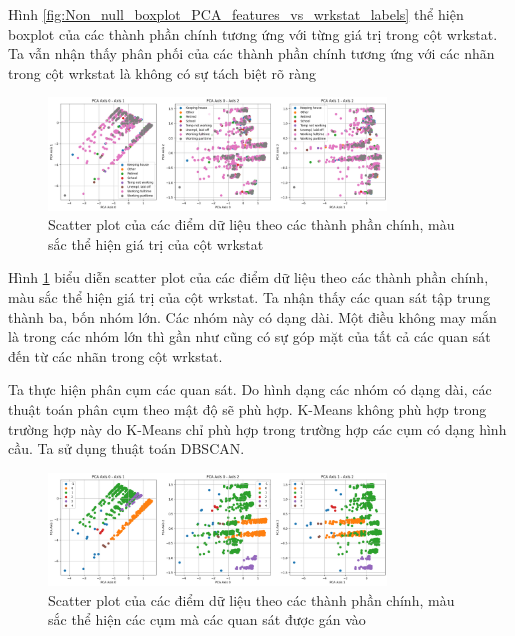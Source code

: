Hình \ref{fig:Non_null_boxplot_PCA_features_vs_wrkstat_labels} thể hiện boxplot của các thành phần chính tương ứng với từng giá trị trong cột wrkstat.
Ta vẫn nhận thấy phân phối của các thành phần chính tương ứng với các nhãn trong cột wrkstat là không có sự tách biệt rõ ràng

\begin{figure}[H]
    \centering
    \includegraphics[width=0.8\textwidth]{figures/Thanh/Data_Analysis/Non_null_scatterplot_couples_of_PCA_features_vs_wrkstat_labels.png}
    \caption{Scatter plot của các điểm dữ liệu theo các thành phần chính, màu sắc thể hiện giá trị của cột wrkstat}
    \label{fig:Non_null_scatterplot_couples_of_PCA_features_vs_wrkstat_labels}
\end{figure}

Hình \ref{fig:Non_null_scatterplot_couples_of_PCA_features_vs_wrkstat_labels} biểu diễn scatter plot của các điểm dữ liệu theo các thành phần chính, màu sắc thể hiện giá trị của cột wrkstat.
Ta nhận thấy các quan sát tập trung thành ba, bốn nhóm lớn.
Các nhóm này có dạng dài.
Một điều không may mắn là trong các nhóm lớn thì gần như cũng có sự góp mặt của tất cả các quan sát đến từ các nhãn trong cột wrkstat.

Ta thực hiện phân cụm các quan sát.
Do hình dạng các nhóm có dạng dài, các thuật toán phân cụm theo mật độ sẽ phù hợp.
K-Means không phù hợp trong trường hợp này do K-Means chỉ phù hợp trong trường hợp các cụm có dạng hình cầu.
Ta sử dụng thuật toán DBSCAN.

\begin{figure}[H]
    \centering
    \includegraphics[width=0.8\textwidth]{figures/Thanh/Data_Analysis/Non_null_scatterplot_couples_of_PCA_features_vs_pseudo_clustering_labels.png}
    \caption{Scatter plot của các điểm dữ liệu theo các thành phần chính, màu sắc thể hiện các cụm mà các quan sát được gán vào}
    \label{fig:Non_null_scatterplot_couples_of_PCA_features_vs_pseudo_clustering_labels}
\end{figure}


